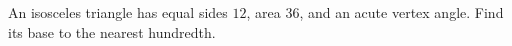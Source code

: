 An isosceles triangle has equal sides $12$, area $36$, and an acute vertex angle. Find its base to the nearest hundredth.
